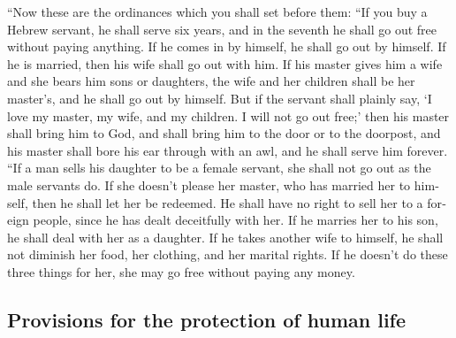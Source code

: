 \begin{paracol}{2}
\begin{otherlanguage}{english}
 ``Now these are the ordinances which you shall set before
them:  ``If you buy a Hebrew servant, he shall serve six
years, and in the seventh he shall go out free without paying anything.
 If he comes in by himself, he shall go out by himself. If
he is married, then his wife shall go out with him.  If
his master gives him a wife and she bears him sons or daughters, the
wife and her children shall be her master's, and he shall go out by
himself.  But if the servant shall plainly say, `I love my
master, my wife, and my children. I will not go out free;'
 then his master shall bring him to God, and shall bring
him to the door or to the doorpost, and his master shall bore his ear
through with an awl, and he shall serve him forever.  ``If
a man sells his daughter to be a female servant, she shall not go out as
the male servants do.  If she doesn't please her master,
who has married her to himself, then he shall let her be redeemed. He
shall have no right to sell her to a foreign people, since he has dealt
deceitfully with her.  If he marries her to his son, he
shall deal with her as a daughter.  If he takes another
wife to himself, he shall not diminish her food, her clothing, and her
marital rights.  If he doesn't do these three things for
her, she may go free without paying any money.

\hypertarget{provisions-for-the-protection-of-human-life}{%
\subsection{Provisions for the protection of human
life}\label{provisions-for-the-protection-of-human-life}}


\end{otherlanguage}
\end{paracol}
